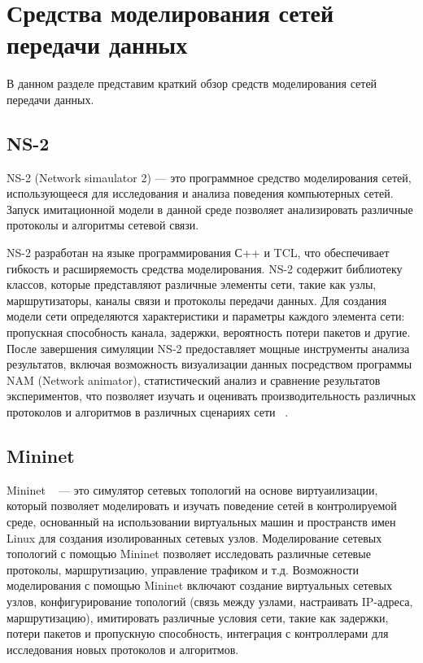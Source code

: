 
\chapter{Средства моделирования сетей передачи данных}
\label{chap1}

В данном разделе представим краткий обзор средств моделирования сетей
передачи данных.

\section{NS-2}
\label{chap1:sec1}

NS-2 (Network simaulator 2) — это программное средство моделирования
сетей, использующееся для исследования и анализа поведения
компьютерных сетей.  Запуск имитационной модели в данной среде
позволяет анализировать различные протоколы и алгоритмы сетевой связи.

NS-2 разработан на языке программирования С++ и TCL, что обеспечивает
гибкость и расширяемость средства моделирования.  NS-2 содержит
библиотеку классов, которые представляют различные элементы сети,
такие как узлы, маршрутизаторы, каналы связи и протоколы передачи
данных. Для создания модели сети определяются характеристики и
параметры каждого элемента сети: пропускная способность канала,
задержки, вероятность потери пакетов и другие. После завершения
симуляции NS-2 предоставляет мощные инструменты анализа результатов,
включая возможность визуализации данных посредством программы NAM
(Network animator), статистический анализ и сравнение результатов
экспериментов, что позволяет изучать и оценивать производительность
различных протоколов и алгоритмов в различных сценариях
сети ~\cite{NS2-1, NS2-2}.

\section{Mininet}
\label{chap1:sec2}

Mininet ~\cite{mininet} — это симулятор сетевых топологий на основе виртуаилизации,
который позволяет моделировать и изучать поведение сетей в
контролируемой среде, основанный на использовании виртуальных машин и
пространств имен Linux для создания изолированных сетевых
узлов. Моделирование сетевых топологий с помощью Mininet позволяет
исследовать различные сетевые протоколы, маршрутизацию, управление
трафиком и т.д. Возможности моделирования с помощью Mininet включают
создание виртуальных сетевых узлов, конфигурирование топологий (связь
между узлами, настраивать IP-адреса, маршрутизацию), имитировать
различные условия сети, такие как задержки, потери пакетов и
пропускную способность, интеграция с контроллерами для исследования
новых протоколов и алгоритмов. 

